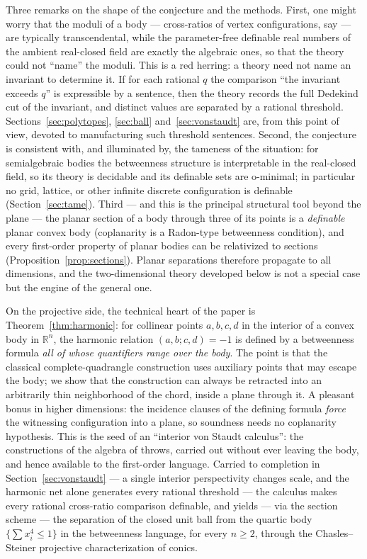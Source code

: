 \documentclass[11pt]{amsart}
\theoremstyle{definition}
\newcommand{\R}{\mathbb{R}}
\begin{document}
Three remarks on the shape of the conjecture and the methods. First, one
might worry that the moduli of a body --- cross-ratios of vertex
configurations, say --- are typically transcendental, while the parameter-free
definable real numbers of the ambient real-closed field are exactly the
algebraic ones, so that the theory could not ``name'' the moduli. This is a
red herring: a theory need not name an invariant to determine it. If for each
rational $q$ the comparison ``the invariant exceeds $q$'' is expressible by a
sentence, then the theory records the full Dedekind cut of the invariant, and
distinct values are separated by a rational threshold.
Sections~\ref{sec:polytopes}, \ref{sec:ball} and~\ref{sec:vonstaudt} are,
from this point of view, devoted to manufacturing such threshold sentences.
Second, the conjecture is consistent with, and illuminated by, the tameness
of the situation: for semialgebraic bodies the betweenness structure is
interpretable in the real-closed field, so its theory is decidable and its
definable sets are o-minimal; in particular no grid, lattice, or other
infinite discrete configuration is definable (Section~\ref{sec:tame}).
Third --- and this is the principal structural tool beyond the plane --- the
planar section of a body through three of its points is a \emph{definable}
planar convex body (coplanarity is a Radon-type betweenness condition), and
every first-order property of planar bodies can be relativized to sections
(Proposition~\ref{prop:sections}). Planar separations therefore propagate to
all dimensions, and the two-dimensional theory developed below is not a
special case but the engine of the general one.

On the projective side, the technical heart of the paper is
Theorem~\ref{thm:harmonic}: for collinear points $a,b,c,d$ in the interior of
a convex body in $\R^n$, the harmonic relation $(a,b;c,d)=-1$ is defined by a
betweenness formula \emph{all of whose quantifiers range over the body}. The
point is that the classical complete-quadrangle construction uses auxiliary
points that may escape the body; we show that the construction can always be
retracted into an arbitrarily thin neighborhood of the chord, inside a plane
through it. A pleasant bonus in higher dimensions: the incidence clauses of
the defining formula \emph{force} the witnessing configuration into a plane,
so soundness needs no coplanarity hypothesis. This is the seed of an
``interior von Staudt calculus'': the constructions of the algebra of
throws, carried out without ever leaving the body, and hence available to the
first-order language. Carried to completion in Section~\ref{sec:vonstaudt}
--- a single interior perspectivity changes scale, and the harmonic net alone
generates every rational threshold --- the calculus makes every
rational cross-ratio comparison definable, and yields --- via the section
scheme --- the separation of the closed unit ball from the quartic body
$\{\sum x_i^4\le1\}$ in the betweenness language, for every $n\ge2$, through
the Chasles--Steiner projective characterization of conics.
\end{document}
